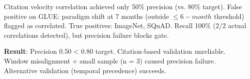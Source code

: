 
Citation velocity correlation achieved only 50\% precision (vs. 80\% target). False positive on GLUE: paradigm shift at 7 months (outside $\leq 6-month$ threshold) flagged as correlated. True positives: ImageNet, SQuAD. Recall 100\% (2/2 actual correlations detected), but precision failure blocks gate.

\textbf{Result}: Precision 0.50 < 0.80 target. Citation-based validation unreliable. Window misalignment + small sample (n = 3) caused precision failure. Alternative validation (temporal precedence) succeeds.
